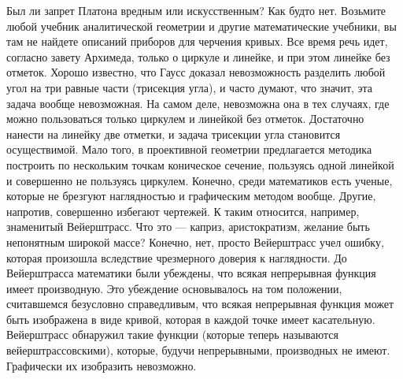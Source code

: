 Был  ли  запрет Платона  вредным  или  искусственным? Как  будто  нет.
Возьмите любой учебник аналитической геометрии и другие математические
учебники, вы там не найдете описаний приборов для черчения кривых. Все
время речь идет, согласно завету Архимеда, только о циркуле и линейке,
и при  этом линейке  без отметок. Хорошо  известно, что  Гаусс доказал
невозможность  разделить любой  угол  на три  равные части  (трисекция
угла), и часто  думают, что значит, эта задача  вообще невозможная. На
самом  деле, невозможна  она  в тех  случаях,  где можно  пользоваться
только циркулем и линейкой без  отметок. Достаточно нанести на линейку
две  отметки, и  задача трисекции  угла становится  осуществимой. Мало
того,  в  проективной  геометрии предлагается  методика  построить  по
нескольким  точкам  коническое  сечение, пользуясь  одной  линейкой  и
совершенно  не пользуясь  циркулем.  Конечно,  среди математиков  есть
ученые, которые не брезгуют наглядностью и графическим методом вообще.
Другие,  напротив, совершенно  избегают чертежей.  К таким  относится,
например, знаменитый  Вейерштрасс. Что это ---  каприз, аристократизм,
желание   быть  непонятным   широкой  массе?   Конечно,  нет,   просто
Вейерштрасс  учел  ошибку,  которая произошла  вследствие  чрезмерного
доверия  к  наглядности.  До Вейерштрасса  математики  были  убеждены,
что  всякая  непрерывная  функция  имеет  производную.  Это  убеждение
основывалось  на том  положении, считавшемся  безусловно справедливым,
что всякая  непрерывная функция может  быть изображена в  виде кривой,
которая  в  каждой  точке  имеет  касательную.  Вейерштрасс  обнаружил
такие функции (которые теперь называются вейерштрассовскими), которые,
будучи непрерывными,  производных не  имеют. Графически  их изобразить
невозможно.

